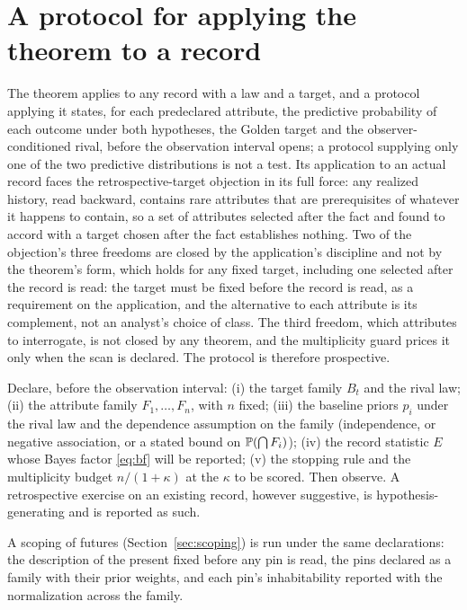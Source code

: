 \section{A protocol for applying the theorem to a record} \label{sec:protocol} The theorem applies to any record with a law and a target, and a protocol applying it states, for each predeclared attribute, the predictive probability of each outcome under both hypotheses, the Golden target and the observer-conditioned rival, before the observation interval opens; a protocol supplying only one of the two predictive distributions is not a test. Its
application to an actual record faces the retrospective-target objection
in its full force: any realized history, read backward, contains rare
attributes that are prerequisites of whatever it happens to contain, so a
set of attributes selected after the fact and found to accord with a
target chosen after the fact establishes nothing. Two of the objection's three freedoms are closed by the application's discipline and not by the theorem's form, which holds for any fixed target, including one selected after the record is read: the target must be fixed before the record is read, as a requirement on the application, and the alternative to each attribute is its
complement, not an analyst's choice of class. The third freedom, which
attributes to interrogate, is not closed by any theorem, and the
multiplicity guard prices it only when the scan is declared. The protocol
is therefore prospective.

\begin{definition}\label{def:protocol}
Declare, before the observation interval: (i) the target family $B_t$ and
the rival law; (ii) the attribute family $F_1,\dots,F_n$, with $n$ fixed;
(iii) the baseline priors $p_i$ under the rival law and the dependence
assumption on the family (independence, or negative association, or a
stated bound on $\mathbb{P}(\bigcap F_i)$); (iv) the record statistic $E$ whose
Bayes factor \eqref{eq:bf} will be reported; (v) the stopping rule and
the multiplicity budget $n/(1+\kappa)$ at the $\kappa$ to be scored. Then
observe. A retrospective exercise on an existing record, however
suggestive, is hypothesis-generating and is reported as such.
\end{definition}

\noindent A scoping of futures (Section~\ref{sec:scoping}) is run under the
same declarations: the description of the present fixed before any pin
is read, the pins declared as a family with their prior weights, and
each pin's inhabitability reported with the normalization across the
family.

